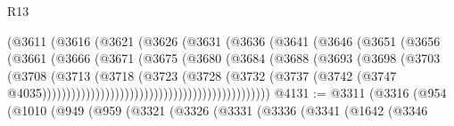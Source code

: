 \begin{lexlean}{R13}
\begin{coremodule}
                                        (@3611
                                          (@3616
                                            (@3621
                                              (@3626
                                                (@3631
                                                  (@3636
                                                    (@3641
                                                      (@3646
                                                        (@3651
                                                          (@3656
                                                            (@3661
                                                              (@3666
                                                                (@3671
                                                                  (@3675
                                                                    (@3680
                                                                      (@3684
                                                                        (@3688
                                                                          (@3693
                                                                            (@3698
                                                                              (@3703
                                                                                (@3708
                                                                                  (@3713
                                                                                    (@3718
                                                                                      (@3723
                                                                                        (@3728
                                                                                          (@3732
                                                                                            (@3737
                                                                                              (@3742
                                                                                                (@3747
                                                                                                  @4035)))))))))))))))))))))))))))))))))))))))))))))))
@4131 := @3311
    (@3316
      (@954
        (@1010
          (@949
            (@959
              (@3321
                (@3326
                  (@3331
                    (@3336
                      (@3341
                        (@1642
                          (@3346

\end{coremodule}
\end{lexlean}
